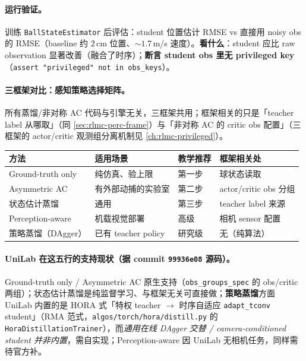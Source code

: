 \paragraph{运行验证。}训练 \verb|BallStateEstimator| 后评估：student 位置估计 RMSE vs 直接用 noisy obs 的 RMSE（baseline 约 $2$\,cm 位置、$\sim 1.7$\,m/s 速度）。\textbf{看什么}：student 应比 raw observation 显著改善（融合了时序）；\textbf{断言 student obs 里无 privileged key}（\verb|assert "privileged" not in obs_keys|）。

\paragraph{三框架对比：感知策略选择矩阵。}所有蒸馏/非对称 AC 代码与引擎无关，三框架共用；框架相关的只是「teacher label 从哪取」（同 \cref{sec:rlmc-perc-frame}）与「非对称 AC 的 critic obs 配置」（三框架的 actor/critic 观测组分离机制见 \cref{ch:rlmc-privileged}）。

\begin{center}
\small
\begin{tabular}{@{}llll@{}}
\toprule
方法 & 适用场景 & 教学推荐 & 框架相关处 \\
\midrule
Ground-truth only & 纯仿真、验上限 & 第一步 & 球状态读取 \\
Asymmetric AC & 有外部动捕的实验室 & 第二步 & actor/critic obs 分组 \\
状态估计蒸馏 & 通用 & 第三步 & teacher label 来源 \\
Perception-aware & 机载视觉部署 & 高级 & 相机 sensor 配置 \\
策略蒸馏（DAgger） & 已有 teacher policy & 研究级 & 无（纯算法） \\
\bottomrule
\end{tabular}
\end{center}

\paragraph{UniLab 在这五行的支持现状（据 commit \texttt{99936e08} 源码）。}Ground-truth only / Asymmetric AC 原生支持（\texttt{obs\_groups\_spec} 的 obs/critic 两组）；状态估计蒸馏是纯监督学习、与框架无关可直接做；\textbf{策略蒸馏}方面 UniLab 内置的是 HORA 式「特权 teacher $\to$ 时序自适应 \texttt{adapt\_tconv} student」（RMA 范式，\texttt{algos/torch/hora/distill.py} 的 \texttt{HoraDistillationTrainer}），而\emph{通用在线 DAgger 交替 / camera-conditioned student 并非内置}，需自实现；Perception-aware 因 UniLab 无相机任务，同样需待官方补。

